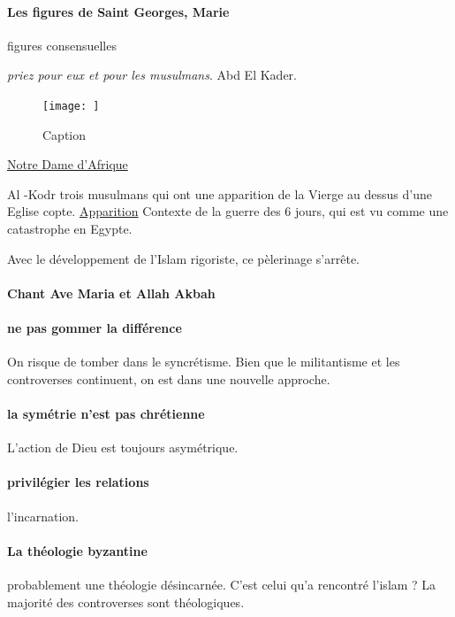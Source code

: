 \paragraph{Les figures de Saint Georges, Marie} figures consensuelles

\begin{Ex}
     \textit{priez pour eux et pour les musulmans}. Abd El Kader. 
     \begin{figure}
         \centering
         \texttt{[image: ]}
         \caption{Caption}
         \label{fig:my_label}
     \end{figure}\href{https://fr.wikipedia.org/wiki/Basilique_Notre-Dame-d%27Afrique}{Notre Dame d'Afrique}
\end{Ex}

\begin{Ex}
    Al -Kodr
    trois musulmans qui ont une apparition de la Vierge au dessus d'une Eglise copte.
    \href{https://fr.wikipedia.org/wiki/Notre-Dame_de_Zeitoun#:~:text=Notre%2DDame%20de%20Zeitoun%20est,Caire%2C%20de%201968%20%C3%A0%201971.}{Apparition}
    Contexte de la guerre des 6 jours, qui est vu comme une catastrophe en Egypte.

    Avec le développement de l'Islam rigoriste, ce pèlerinage s'arrête.
\end{Ex}

\paragraph{Chant Ave Maria et Allah Akbah}

\paragraph{ne pas gommer la différence} On risque de tomber dans le syncrétisme. Bien que le militantisme et les controverses continuent, on est dans une nouvelle approche.

\paragraph{la symétrie n'est pas chrétienne} L'action de Dieu est toujours asymétrique. 

\paragraph{privilégier les relations} l'incarnation. 

\paragraph{La théologie byzantine} probablement une théologie désincarnée. C'est celui qu'a rencontré l'islam ? La majorité des controverses sont théologiques. 